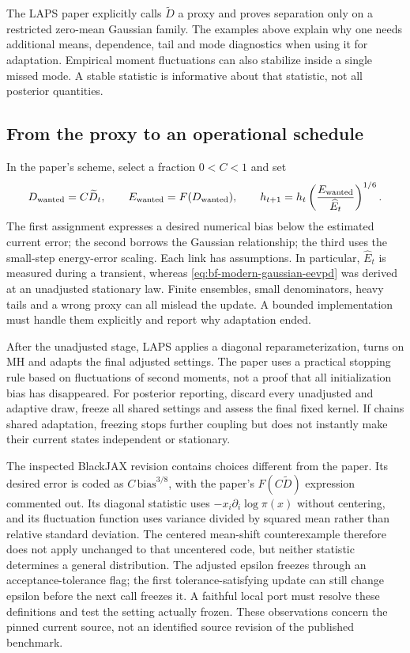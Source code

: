 The LAPS paper explicitly calls $\widetilde D$ a proxy and proves separation
only on a restricted zero-mean Gaussian family. The examples above explain
why one needs additional means, dependence, tail and mode diagnostics when
using it for adaptation. Empirical moment fluctuations can also stabilize
inside a single missed mode. A stable statistic is informative about that
statistic, not all posterior quantities.

\subsection{From the proxy to an operational schedule}

In the paper's scheme, select a fraction $0<C<1$ and set
\begin{equation}
 D_{\rm wanted}=C\widetilde D_t,\qquad
 E_{\rm wanted}=F(D_{\rm wanted}),\qquad
 h_{t+1}=h_t\left(\frac{E_{\rm wanted}}{\widehat E_t}\right)^{1/6}.
 \label{eq:bf-modern-laps-practical-schedule}
\end{equation}
The first assignment expresses a desired numerical bias below the estimated
current error; the second borrows the Gaussian relationship; the third uses
the small-step energy-error scaling. Each link has assumptions. In
particular, $\widehat E_t$ is measured during a transient, whereas
\eqref{eq:bf-modern-gaussian-eevpd} was derived at an unadjusted stationary
law. Finite ensembles, small denominators, heavy tails and a wrong proxy can
all mislead the update. A bounded implementation must handle them explicitly
and report why adaptation ended.

After the unadjusted stage, LAPS applies a diagonal reparameterization, turns
on MH and adapts the final adjusted settings. The paper uses a practical
stopping rule based on fluctuations of second moments, not a proof that all
initialization bias has disappeared. For posterior reporting, discard every
unadjusted and adaptive draw, freeze all shared settings and assess the final
fixed kernel. If chains shared adaptation, freezing stops further coupling
but does not instantly make their current states independent or stationary.

The inspected BlackJAX revision contains choices different from the paper.
Its desired error is coded as $C\,\mathrm{bias}^{3/8}$, with the paper's
$F(C\widetilde D)$ expression commented out. Its diagonal statistic uses
$-x_i\partial_i\log\pi(x)$ without centering, and its fluctuation function
uses variance divided by squared mean rather than relative standard
deviation. The centered mean-shift counterexample therefore does not apply
unchanged to that uncentered code, but neither statistic determines a general
distribution. The adjusted epsilon freezes through an acceptance-tolerance
flag; the first tolerance-satisfying update can still change epsilon before
the next call freezes it. A faithful local port must resolve these definitions
and test the setting actually frozen. These observations concern the pinned
current source, not an identified source revision of the published benchmark.

